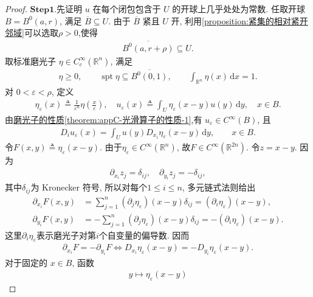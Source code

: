 \documentclass[../../main.tex]{subfiles}
\begin{document}
\begin{proof}
$\mathbf{Step}\mathbf{1.}$先证明 $u$ 在每个闭包包含于 $U$ 的开球上几乎处处为常数.
任取开球 $B=B^{0}(a,r)$, 满足 $\overline{B}\subseteq U$.
由于 $\overline{B}$ 紧且 $U$ 开, 利用\cref{proposition:紧集的相对紧开邻域}可以选取$\rho>0$,使得
\begin{align*}
\overline{B^{0}(a,r+\rho)}\subseteq U.
\end{align*}
取标准磨光子 $\eta\in C_c^\infty(\mathbb{R}^n)$, 满足
\begin{align*}
\eta\geqslant0,\qquad
\operatorname{spt}\eta\subseteq\overline{B^{0}(0,1)},\qquad
\int_{\mathbb{R}^n}\eta(x)\,\mathrm{d}x=1.
\end{align*}
对 $0<\varepsilon<\rho$, 定义
\begin{align*}
\eta_\varepsilon(x)
\triangleq\frac{1}{\varepsilon^n}
\eta\left(\frac{x}{\varepsilon}\right),\quad 
u_\varepsilon(x)
\triangleq\int_U\eta_\varepsilon(x-y)u(y)\,\mathrm{d}y,
\quad x\in B.
\end{align*}
由\hyperref[theorem:appC-光滑算子的性质]{磨光子的性质\ref{theorem:appC-光滑算子的性质-1}},有
$u_\varepsilon\in C^\infty(B)$, 且
\begin{align}\label{eqegjiojerjieeieieee}
D_i u_\varepsilon(x)
=\int_Uu(y)D_{x_i}\eta_\varepsilon(x-y)\,\mathrm{d}y,
\qquad x\in B.
\end{align}
令$F(x,y)\triangleq\eta_\varepsilon(x-y)$. 由于$\eta_\varepsilon\in C^\infty(\mathbb{R}^n)$, 故$F\in C^\infty(\mathbb{R}^{2n})$.
令$z=x-y$. 因为
\begin{align*}
\partial_{x_i}z_j=\delta_{ij},\quad\partial_{y_i}z_j=-\delta_{ij},
\end{align*}
其中$\delta_{ij}$为 Kronecker 符号, 所以对每个$1\leqslant i\leqslant n$, 多元链式法则给出
\begin{align*}
\partial_{x_i}F(x,y)
&=\sum\limits_{j=1}^{n}(\partial_j\eta_\varepsilon)(x-y)\delta_{ij}
=(\partial_i\eta_\varepsilon)(x-y),\\
\partial_{y_i}F(x,y)
&=-\sum\limits_{j=1}^{n}(\partial_j\eta_\varepsilon)(x-y)\delta_{ij}
=-(\partial_i\eta_\varepsilon)(x-y).
\end{align*}
这里$\partial_i\eta_\varepsilon$表示磨光子对第$i$个自变量的偏导数. 因而
\begin{align}\label{eq::JIFJIOJIOWIJOjjjjjiiiii}
\partial_{x_i}F=-\partial_{y_i}F\iff D_{x_i}\eta_\varepsilon(x-y)
=-D_{y_i}\eta_\varepsilon(x-y).
\end{align}
对于固定的 $x\in B$, 函数
\begin{align*}
y\longmapsto\eta_\varepsilon(x-y)
\end{align*}

\end{proof}
\end{document}
